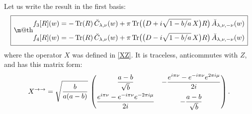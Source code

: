 \documentclass[11pt]{article}
\makeatletter
\newcommand*{\wideboxed}[1]{\setlength{\fboxsep}{1ex}%
  \fbox{\m@th$\displaystyle#1$}}
\DeclareMathOperator{\Tr}{Tr}
\newcommand{\rar}{{\rightarrow}}
\newcommand{\bA}{\breve{A}}
\newcommand{\bC}{\breve{C}}
\makeatother
\begin{document}
Let us write the result in the first basis:
\begin{equation}\label{tpf-34}
\wideboxed{
\begin{aligned}
f_{3}[R](w)&=-\Tr (R)\,\bC_{\lambda,\nu}(w)
+\pi\Tr\bigl(\bigl(D+i\sqrt{1-b/a}\,X\bigr)R\bigr)\,\bA_{\lambda,\nu,-\nu}(w)
\\[3pt]
f_{4}[R](w)&=-\Tr (R)\,\bC_{\lambda,\nu}(w)
+\pi\Tr\bigl(\bigl(D-i\sqrt{1-b/a}\,X\bigr)R\bigr)\,\bA_{\lambda,\nu,-\nu}(w)
\end{aligned}
}
\end{equation}
where the operator $X$ was defined in \eqref{XZ}. It is traceless, anticommutes with $Z$, and has this matrix form:
\begin{equation}
X^{\rar\rar}=\sqrt{\frac{b}{a(a-b)}}\,
\begin{pmatrix}
\dfrac{a-b}{\sqrt{b}} & 
-\dfrac{e^{i\pi\nu}-e^{-i\pi\nu}e^{2\pi i\mu}}{2i}\vspace{4pt}\\
\dfrac{e^{i\pi\nu}-e^{-i\pi\nu}e^{-2\pi i\mu}}{2i} &
-\dfrac{a-b}{\sqrt{b}}
\end{pmatrix}.
\end{equation}
\end{document}
